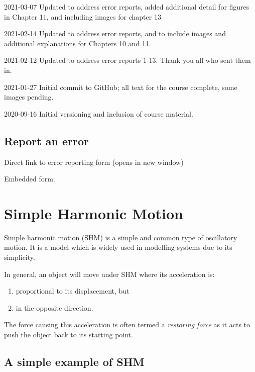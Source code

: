 \documentclass[
]{book}
\providecommand{\tightlist}{%
  \setlength{\itemsep}{0pt}\setlength{\parskip}{0pt}}
\begin{document}
2021-03-07 Updated to address error reports, added additional detail for figures in Chapter 11, and including images for chapter 13

2021-02-14 Updated to address error reports, and to include images and additional explanations for Chapters 10 and 11.

2021-02-12 Updated to address error reports 1-13. Thank you all who sent them in.

2021-01-27 Initial commit to GitHub; all text for the course complete, some images pending.

2020-09-16 Initial versioning and inclusion of course material.

\hypertarget{report-an-error}{%
\section*{Report an error}\label{report-an-error}}

Direct link to error reporting form (opens in new window)

Embedded form:

\hypertarget{sec:shm}{%
\chapter{Simple Harmonic Motion}\label{sec:shm}}

Simple harmonic motion (SHM) is a simple and common type of oscillatory motion. It is a model which is widely used in modelling systems due to its simplicity.

In general, an object will move under SHM where its acceleration is:

\begin{enumerate}
\def\labelenumi{\arabic{enumi}.}
\tightlist
\item
  proportional to its displacement, but
\item
  in the opposite direction.
\end{enumerate}

The force causing this acceleration is often termed a \emph{restoring force} as it acts to push the object back to its starting point.

\hypertarget{sec:ch1-simpleshmexample}{%
\section{A simple example of SHM}\label{sec:ch1-simpleshmexample}}
\end{document}
